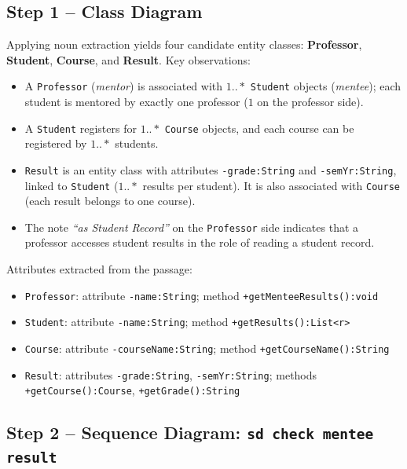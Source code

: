 \documentclass[11pt, a4paper, notitlepage]{report}
\theoremstyle{definition}
\theoremstyle{remark}
\theoremstyle{definition}
\begin{document}
\subsection{Step 1 -- Class Diagram}

Applying noun extraction yields four candidate entity classes: \textbf{Professor},
\textbf{Student}, \textbf{Course}, and \textbf{Result}. Key observations:

\begin{itemize}
  \item A \texttt{Professor} (\emph{mentor}) is associated with $1..*$ \texttt{Student}
        objects (\emph{mentee}); each student is mentored by exactly one professor
        ($1$ on the professor side).
  \item A \texttt{Student} registers for $1..*$ \texttt{Course} objects, and each course
        can be registered by $1..*$ students.
  \item \texttt{Result} is an entity class with attributes \texttt{-grade:String} and
        \texttt{-semYr:String}, linked to \texttt{Student} ($1..*$ results per student).
        It is also associated with \texttt{Course} (each result belongs to one course).
  \item The note \emph{``as Student Record''} on the \texttt{Professor} side indicates that
        a professor accesses student results in the role of reading a student record.
\end{itemize}

Attributes extracted from the passage:
\begin{itemize}
  \item \texttt{Professor}: attribute \texttt{-name:String};
        method \texttt{+getMenteeResults():void}
  \item \texttt{Student}: attribute \texttt{-name:String};
        method \texttt{+getResults():List<r>}
  \item \texttt{Course}: attribute \verb|-courseName:String|;
        method \verb|+getCourseName():String|
  \item \texttt{Result}: attributes \verb|-grade:String|, \verb|-semYr:String|;
        methods \verb|+getCourse():Course|, \verb|+getGrade():String|
\end{itemize}

\subsection{Step 2 -- Sequence Diagram: \texttt{sd check mentee result}}
\end{document}
